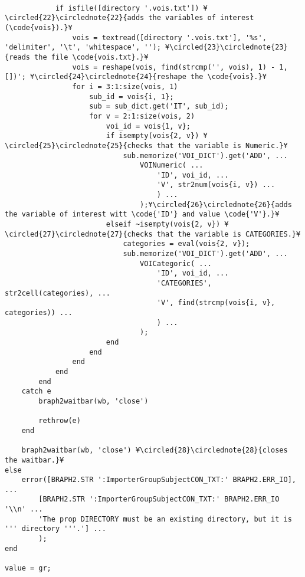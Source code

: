 \documentclass{tufte-handout}
\begin{document}
\begin{lstlisting}
            
            if isfile([directory '.vois.txt']) ¥\circled{22}\circlednote{22}{adds the variables of interest (\code{vois}).}¥
                vois = textread([directory '.vois.txt'], '%s', 'delimiter', '\t', 'whitespace', ''); ¥\circled{23}\circlednote{23}{reads the file \code{vois.txt}.}¥
                vois = reshape(vois, find(strcmp('', vois), 1) - 1, [])'; ¥\circled{24}\circlednote{24}{reshape the \code{vois}.}¥
                for i = 3:1:size(vois, 1)
                    sub_id = vois{i, 1};
                    sub = sub_dict.get('IT', sub_id);
                    for v = 2:1:size(vois, 2)
                        voi_id = vois{1, v};
                        if isempty(vois{2, v}) ¥\circled{25}\circlednote{25}{checks that the variable is Numeric.}¥
                            sub.memorize('VOI_DICT').get('ADD', ...
                                VOINumeric( ...
                                    'ID', voi_id, ...
                                    'V', str2num(vois{i, v}) ...
                                    ) ...
                                );¥\circled{26}\circlednote{26}{adds the variable of interest witt \code{'ID'} and value \code{'V'}.}¥
                        elseif ~isempty(vois{2, v}) ¥\circled{27}\circlednote{27}{checks that the variable is CATEGORIES.}¥
                            categories = eval(vois{2, v});
                            sub.memorize('VOI_DICT').get('ADD', ...
                                VOICategoric( ...
                                    'ID', voi_id, ...
                                    'CATEGORIES', str2cell(categories), ...
                                    'V', find(strcmp(vois{i, v}, categories)) ...
                                    ) ...
                                );
                        end                        
                    end
                end
            end
        end
    catch e
        braph2waitbar(wb, 'close')
        
        rethrow(e)
    end
    
	braph2waitbar(wb, 'close') ¥\circled{28}\circlednote{28}{closes the waitbar.}¥
else
    error([BRAPH2.STR ':ImporterGroupSubjectCON_TXT:' BRAPH2.ERR_IO], ...
        [BRAPH2.STR ':ImporterGroupSubjectCON_TXT:' BRAPH2.ERR_IO '\\n' ...
        'The prop DIRECTORY must be an existing directory, but it is ''' directory '''.'] ...
        );
end

value = gr;
\end{lstlisting}
\clearpage
\end{document}
